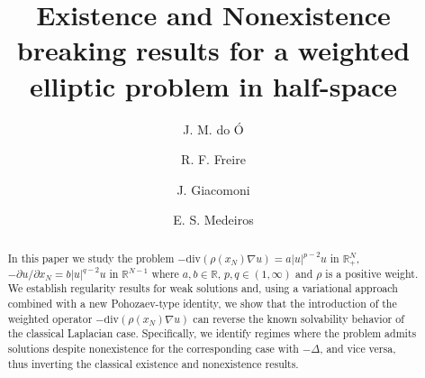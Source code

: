 \documentclass[12pt,reqno]{amsart}
\begin{document}
	\title[Hardy- Sobolev type inequalities]{Existence and Nonexistence breaking results for a weighted elliptic
problem in half-space}
    
	
\author[J. M.\ do \'O]{J. M. do \'O}
\address[Jo\~{a}o Marcos do \'O]{Dep. Mathematics, Federal University of Para\'{\i}ba
		\newline{}-900, Jo\~ao Pessoa-PB, Brazil}
	
\author[R. F. Freire]{R. F. Freire}
\address[R. F. Freire]{Université de Pau et des Pays de l’Adour, 
Laboratoire de Mathématiques et de leurs Applications (LMAP), 
Bâtiment IPRA, Avenue de l’Université, 64013 Pau, France}


\author[Giacomoni]{J. Giacomoni}
\address{Universit\'{e} de Pau et des Pays de l'Adour, Laboratoire de math\'{e}matiques et de leurs applications (LMAP), Bat. IPRA, Avenue de l’Université, 64013 Pau, France}


\author[Medeiros]{E. S. Medeiros}
	\address{Universidade Federal da Para\'iba, Departamento de Matem\'atica, 58051-900 Jo\~{a}o Pessoa-PB, Brazil}
		

   
	
	\begin{abstract}  
		In this paper we study the problem $-\mathrm{div}(\rho(x_N)\nabla u)=a|u|^{p-2}u$ in $\mathds{R}^N_+$, $-\partial u/\partial x_N=b|u|^{q-2}u$ in $\mathds{R}^{N-1}$ where $a,b \in \mathds{R}$, $p,q\in (1,\infty)$ and $\rho$ is a positive weight. We establish regularity results for weak solutions and, using a variational approach combined with a new Pohozaev-type identity, we show that the introduction of the weighted operator $-\mathrm{div}(\rho(x_N)\nabla u)$ can reverse the known solvability behavior of the classical Laplacian case. Specifically, we identify regimes where the problem admits solutions despite nonexistence for the corresponding case with $-\Delta$, and vice versa, thus inverting the classical existence and nonexistence results.
	\end{abstract}
	
	\maketitle
	
\end{document}

